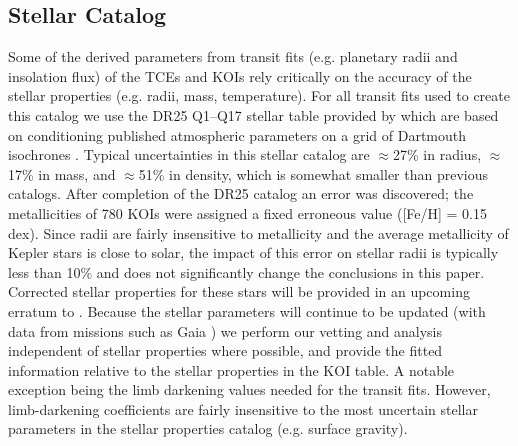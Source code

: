 \subsection{Stellar Catalog}
Some of the derived parameters from transit fits (e.g. planetary radii and insolation flux) of the TCEs and KOIs rely critically on the accuracy of the stellar properties (e.g. radii, mass, temperature).   For all transit fits used to create this catalog we use the DR25 Q1--Q17 stellar table provided by \citet{Mathur2017ApJS} which are based on conditioning published atmospheric parameters on a grid of Dartmouth isochrones \citep{Dotter2008}.  Typical uncertainties in this stellar catalog are $\approx$27\% in radius, $\approx$17\% in mass, and $\approx$51\% in density, which is somewhat smaller than previous catalogs. 
{\color{blue}After completion of the DR25 catalog an error was discovered; the metallicities of 780 KOIs were assigned a fixed erroneous value ([Fe/H] = 0.15 dex). Since radii are fairly insensitive to metallicity and the average metallicity of Kepler stars is close to solar, the impact of this error on stellar radii is typically less than 10\% and does not significantly change the conclusions in this paper. Corrected stellar properties for these stars will be provided in an upcoming erratum to \citet{Mathur2017ApJS}. Because the stellar parameters will continue to be updated (with data from missions such as Gaia \citep{gaia1,gaia2}) we perform our vetting and analysis independent of stellar properties where possible, and provide the fitted information relative to the stellar properties in the KOI table.  A notable exception being the limb darkening values needed for the transit fits. However, limb-darkening coefficients are fairly insensitive to the most uncertain stellar parameters in the stellar properties catalog (e.g. surface gravity).}